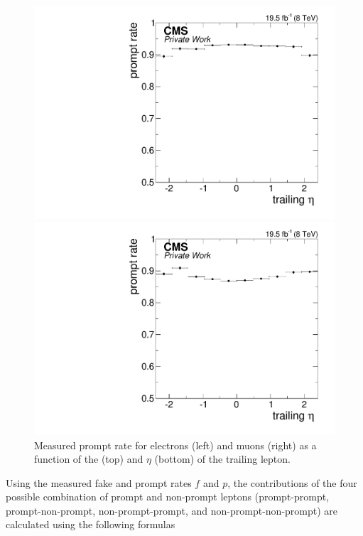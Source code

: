 \begin{figure}[htbp]
\begin{minipage}[t]{0.49\textwidth}
\includegraphics[width=\textwidth]{plots/BG/nonPrompt/promptRate_ele_Inclusive_Full2012_TrailingEta_None.pdf}
\end{minipage}
\begin{minipage}[t]{0.49\textwidth}
\includegraphics[width=\textwidth]{plots/BG/nonPrompt/promptRate_mu_Inclusive_Full2012_TrailingEta_None.pdf}
\end{minipage}
\caption{Measured prompt rate for electrons (left) and muons (right) as a function of the \pt (top) and $\eta$ (bottom) of the trailing lepton.}


\label{fig:promptRate}
\end{figure} 
Using the measured fake and prompt rates $f$ and $p$, the contributions of the four possible combination of prompt and non-prompt leptons (prompt-prompt, prompt-non-prompt, non-prompt-prompt, and non-prompt-non-prompt) are calculated using the following formulas
